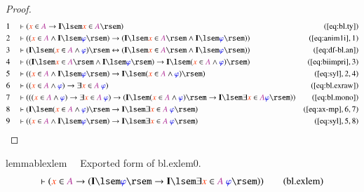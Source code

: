 \begin{proof}
\begin{align}
  1 &&  & \vdash ( \msc{x} \in \mc{A} \rightarrow \mathbf{I} \lsem \msc{x}
      \in \mc{A} \rsem )&(\mbox{\ref{eq:bl.ty}})\notag
  \\ 2 &&  & \vdash ( ( \msc{x} \in \mc{A} \wedge \mathbf{I} \lsem
      \mw{\varphi} \rsem ) \rightarrow ( \mathbf{I} \lsem \msc{x} \in
      \mc{A} \rsem \wedge \mathbf{I} \lsem \mw{\varphi} \rsem )
      )&(\mbox{\ref{eq:anim1i}},1)\notag
  \\ 3 &&  & \vdash ( \mathbf{I} \lsem ( \msc{x} \in \mc{A} \wedge
      \mw{\varphi} ) \rsem \leftrightarrow ( \mathbf{I} \lsem \msc{x}
      \in \mc{A} \rsem \wedge \mathbf{I} \lsem \mw{\varphi} \rsem )
      )&(\mbox{\ref{eq:df-bl.an}})\notag
  \\ 4 &&  & \vdash ( ( \mathbf{I} \lsem \msc{x} \in \mc{A} \rsem
      \wedge \mathbf{I} \lsem \mw{\varphi} \rsem ) \rightarrow
      \mathbf{I} \lsem ( \msc{x} \in \mc{A} \wedge \mw{\varphi} ) \rsem
      )&(\mbox{\ref{eq:biimpri}},3)\notag
  \\ 5 &&  & \vdash ( ( \msc{x} \in \mc{A} \wedge \mathbf{I} \lsem
      \mw{\varphi} \rsem ) \rightarrow \mathbf{I} \lsem ( \msc{x} \in
      \mc{A} \wedge \mw{\varphi} ) \rsem
      )&(\mbox{\ref{eq:syl}},2,4)\notag
  \\ 6 &&  & \vdash ( ( \msc{x} \in \mc{A} \wedge \mw{\varphi} )
      \rightarrow \exists \msc{x} \in \mc{A}~\mw{\varphi}
      )&(\mbox{\ref{eq:bl.exraw}})\notag
  \\ 7 &&  & \vdash ( ( ( \msc{x} \in \mc{A} \wedge \mw{\varphi} )
      \rightarrow \exists \msc{x} \in \mc{A}~\mw{\varphi} ) \rightarrow
      ( \mathbf{I} \lsem ( \msc{x} \in \mc{A} \wedge \mw{\varphi} )
      \rsem \rightarrow \mathbf{I} \lsem \exists \msc{x} \in \mc{A}
      \mw{\varphi} \rsem ) )&(\mbox{\ref{eq:bl.mono}})\notag
  \\ 8 &&  & \vdash ( \mathbf{I} \lsem ( \msc{x} \in \mc{A} \wedge
      \mw{\varphi} ) \rsem \rightarrow \mathbf{I} \lsem \exists \msc{x}
      \in \mc{A}~\mw{\varphi} \rsem )&(\mbox{\ref{eq:ax-mp}},6,7)\notag
  \\ 9 &&  & \vdash ( ( \msc{x} \in \mc{A} \wedge \mathbf{I} \lsem
      \mw{\varphi} \rsem ) \rightarrow \mathbf{I} \lsem \exists \msc{x}
      \in \mc{A}~\mw{\varphi} \rsem )&(\mbox{\ref{eq:syl}},5,8)\notag
\end{align}
\end{proof}

\begin{restatable}{lemma}{blexlem}~~ Exported form of bl.exlem0.
\begin{align}
\vdash ( \msc{x} \in \mc{A} \rightarrow ( \mathbf{I} \lsem \mw{\varphi} \rsem
    \rightarrow \mathbf{I} \lsem \exists \msc{x} \in \mc{A}~\mw{\varphi} \rsem
    ) )\label{eq:bl.exlem}\tag{bl.exlem}
\end{align}
\end{restatable}

